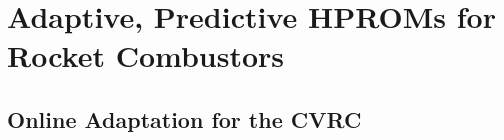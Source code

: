 \chapter{Adaptive, Predictive HPROMs for Rocket Combustors}
\label{chap:AdaptiveResults}


\section{Online Adaptation for the CVRC}


